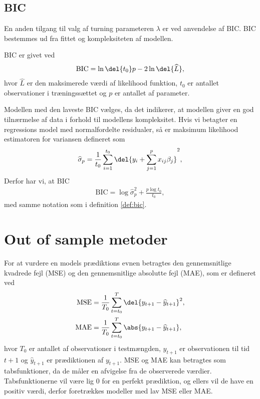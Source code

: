 \subsection{BIC}
En anden tilgang til valg af turning parameteren $\lambda$ er ved anvendelse af BIC.
BIC bestemmes ud fra fittet og kompleksiteten af modellen. 
\begin{defn}\label{def:bic}
BIC er givet ved
\begin{align*}
\text{BIC} = \ln\del{t_0}p - 2 \ln\del{\widehat{L}}, 
\end{align*}
hvor $\widehat{L}$ er den maksimerede værdi af likelihood funktion, $t_0$ er antallet observationer i træningssættet og $p$ er antallet af parameter.
\end{defn} 
Modellen med den laveste BIC vælges, da det indikerer, at modellen giver en god tilnærmelse af data i forhold til modellens kompleksitet. 
Hvis vi betagter en regressions model med normalfordelte residualer, så er maksimum likelihood estimatoren for variansen defineret som
\begin{align*}
\widehat{\sigma}_p = \frac{1}{t_0} \sum_{i=1}^{t_0} \del{y_i + \sum_{j=1}^p x_{ij}\beta_j}^2,
\end{align*}
Derfor har vi, at BIC 
\begin{align*}
\text{BIC} = \log \widehat{\sigma}^2_p + \frac{p \log t_0}{t_0},
\end{align*}
med samme notation som i definition  \ref{def:bic}.






\newpage
\section{Out of sample metoder}

For at vurdere en models prædiktions evnen betragtes den gennemsnitlige kvadrede fejl (MSE) og den gennemsnitlige absolutte fejl (MAE), som er defineret ved
\begin{align}
\text{MSE} & =  \frac{1}{T_0} \sum_{t=t_0}^{T} \del{y_{t+1} - \widehat{y}_{t +1}}^2, \label{eq:mse}  \\
\text{MAE} & =  \frac{1}{T_0} \sum_{t=t_0}^{T} \abs{y_{t+1} - \widehat{y}_{t+1}}, \label{eq:mae} 
\end{align} 
hvor $T_0$ er antallet af observationer i testmængden, $y_{t +1}$ er observationen til tid $t +1$ og $\widehat{y}_{t+1}$ er prædiktionen af $y_{t+1}$.
MSE og MAE kan betragtes som tabsfunktioner, da de måler en afvigelse fra de observerede værdier.
Tabsfunktionerne vil være lig 0 for en perfekt prædiktion, og ellers vil de have en positiv værdi, derfor foretrækkes modeller med lav MSE eller MAE.

